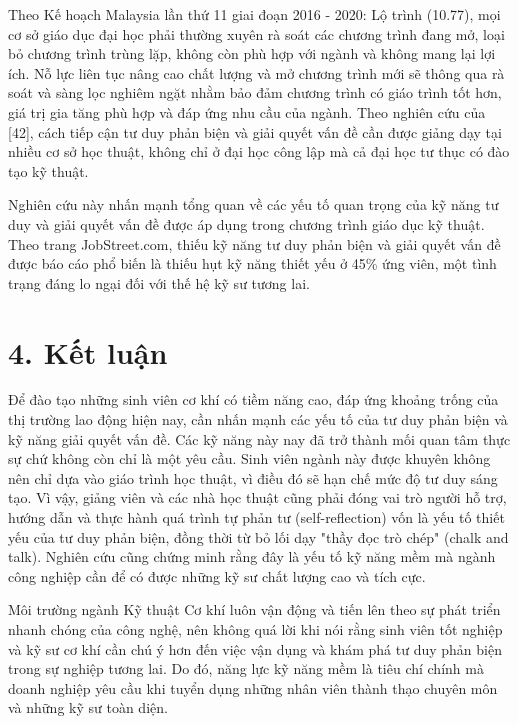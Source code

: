 Theo Kế hoạch Malaysia lần thứ 11 giai đoạn 2016 - 2020: Lộ trình (10.77), mọi cơ sở giáo dục đại học phải thường xuyên rà soát các chương trình đang mở, loại bỏ chương trình trùng lặp, không còn phù hợp với ngành và không mang lại lợi ích. Nỗ lực liên tục nâng cao chất lượng và mở chương trình mới sẽ thông qua rà soát và sàng lọc nghiêm ngặt nhằm bảo đảm chương trình có giáo trình tốt hơn, giá trị gia tăng phù hợp và đáp ứng nhu cầu của ngành. Theo nghiên cứu của {[}42{]}, cách tiếp cận tư duy phản biện và giải quyết vấn đề cần được giảng dạy tại nhiều cơ sở học thuật, không chỉ ở đại học công lập mà cả đại học tư thục có đào tạo kỹ thuật.

Nghiên cứu này nhấn mạnh tổng quan về các yếu tố quan trọng của kỹ năng tư duy và giải quyết vấn đề được áp dụng trong chương trình giáo dục kỹ thuật. Theo trang JobStreet.com, thiếu kỹ năng tư duy phản biện và giải quyết vấn đề được báo cáo phổ biến là thiếu hụt kỹ năng thiết yếu ở 45\% ứng viên, một tình trạng đáng lo ngại đối với thế hệ kỹ sư tương lai.

\section{4. Kết luận}

Để đào tạo những sinh viên cơ khí có tiềm năng cao, đáp ứng khoảng trống của thị trường lao động hiện nay, cần nhấn mạnh các yếu tố của tư duy phản biện và kỹ năng giải quyết vấn đề. Các kỹ năng này nay đã trở thành mối quan tâm thực sự chứ không còn chỉ là một yêu cầu. Sinh viên ngành này được khuyên không nên chỉ dựa vào giáo trình học thuật, vì điều đó sẽ hạn chế mức độ tư duy sáng tạo. Vì vậy, giảng viên và các nhà học thuật cũng phải đóng vai trò người hỗ trợ, hướng dẫn và thực hành quá trình tự phản tư (self-reflection) vốn là yếu tố thiết yếu của tư duy phản biện, đồng thời từ bỏ lối dạy "thầy đọc trò chép" (chalk and talk). Nghiên cứu cũng chứng minh rằng đây là yếu tố kỹ năng mềm mà ngành công nghiệp cần để có được những kỹ sư chất lượng cao và tích cực.

Môi trường ngành Kỹ thuật Cơ khí luôn vận động và tiến lên theo sự phát triển nhanh chóng của công nghệ, nên không quá lời khi nói rằng sinh viên tốt nghiệp và kỹ sư cơ khí cần chú ý hơn đến việc vận dụng và khám phá tư duy phản biện trong sự nghiệp tương lai. Do đó, năng lực kỹ năng mềm là tiêu chí chính mà doanh nghiệp yêu cầu khi tuyển dụng những nhân viên thành thạo chuyên môn và những kỹ sư toàn diện.
